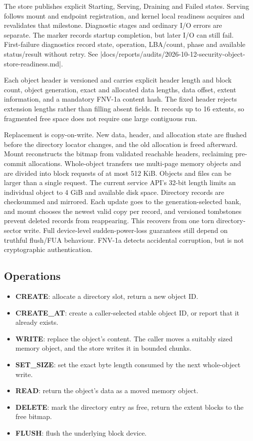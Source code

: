 The store publishes explicit Starting, Serving, Draining and Failed states.
Serving follows mount and endpoint registration, and kernel local readiness
acquires and revalidates that milestone. Diagnostic stages and ordinary I/O
errors are separate. The marker records startup completion, but later I/O can still fail.
First-failure diagnostics record state, operation, LBA/count, phase and
available status/result without retry. See
\repofile|docs/reports/audits/2026-10-12-security-object-store-readiness.md|.

Each object header is versioned and carries explicit header length and block
count, object generation, exact and allocated data lengths, data offset,
extent information, and a mandatory FNV-1a content hash. The fixed header
rejects extension lengths rather than filling absent fields. It records up to 16
extents, so fragmented free space does not require one large contiguous run.

Replacement is copy-on-write. New data, header, and allocation state are
flushed before the directory locator changes, and the old allocation is freed
afterward. Mount reconstructs the bitmap from validated reachable headers,
reclaiming pre-commit allocations. Whole-object transfers use multi-page
memory objects and are divided into block requests of at most 512 KiB. Objects
and files can be larger than a single request. The current service API's
32-bit length limits an individual object to 4 GiB and available disk space.
Directory records are checksummed and mirrored. Each update goes to the
generation-selected bank, and mount chooses the newest valid copy per record, and
versioned tombstones prevent deleted records from reappearing. This recovers
from one torn directory-sector write. Full device-level sudden-power-loss
guarantees still depend on truthful flush/FUA behaviour. FNV-1a detects
accidental corruption, but is not cryptographic authentication.

\subsection{Operations}

\begin{itemize}
    \item \textbf{CREATE}: allocate a directory slot, return a new object ID.
    \item \textbf{CREATE\_AT}: create a caller-selected stable object ID, or
        report that it already exists.
    \item \textbf{WRITE}: replace the object's content. The caller moves a
        suitably sized memory object, and the store writes it in bounded chunks.
    \item \textbf{SET\_SIZE}: set the exact byte length consumed by the next
        whole-object write.
    \item \textbf{READ}: return the object's data as a moved memory object.
    \item \textbf{DELETE}: mark the directory entry as free, return the
        extent blocks to the free bitmap.
    \item \textbf{FLUSH}: flush the underlying block device.
\end{itemize}

